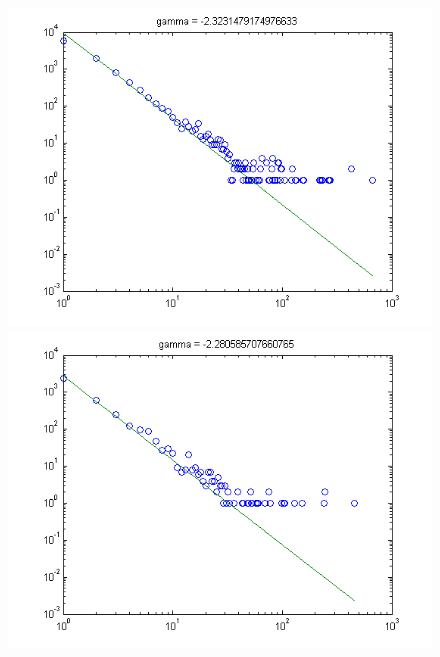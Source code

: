 \documentclass[11pt,a4paper,twocolumn]{article}
\begin{document}
\begin{singlespace}
\begin{figure}
\includegraphics[scale=0.5]{images/logisim}
\includegraphics[scale=0.5]{images/MARS}


\end{figure}
\end{singlespace}
\end{document}
